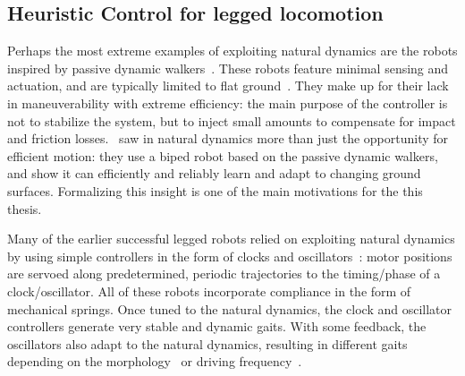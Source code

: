 \subsection{Heuristic Control for legged locomotion}



Perhaps the most extreme examples of exploiting natural dynamics are the robots inspired by passive dynamic walkers~\cite{mcgeer1990passive}. These robots feature minimal sensing and actuation, and are typically limited to flat ground~\cite{bhounsule2012design,wisse2006design}. They make up for their lack in maneuverability with extreme efficiency: the main purpose of the controller is not to stabilize the system, but to inject small amounts to compensate for impact and friction losses.~\textcite{tedrake2005learning} saw in natural dynamics more than just the opportunity for efficient motion: they use a biped robot based on the passive dynamic walkers, and show it can efficiently and reliably learn and adapt to changing ground surfaces.
Formalizing this insight is one of the main motivations for the this thesis. \par
Many of the earlier successful legged robots relied on exploiting natural dynamics by using simple controllers in the form of clocks and oscillators~\cite{sprowitz2013towards,buchli2006resonance,altendorfer2001rhex,owaki2013simple}: motor positions are servoed along predetermined, periodic trajectories to the timing/phase of a clock/oscillator. All of these robots incorporate compliance in the form of mechanical springs. Once tuned to the natural dynamics, the clock and oscillator controllers generate very stable and dynamic gaits. With some feedback, the oscillators also adapt to the natural dynamics, resulting in different gaits depending on the morphology~\cite{owaki2013simple} or driving frequency~\cite{owaki2013simple,owaki2017quadruped}. %

